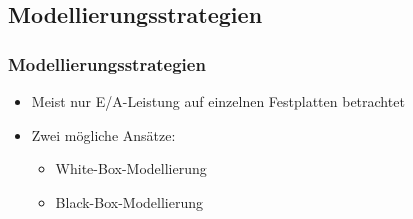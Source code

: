 \documentclass{beamer}
\begin{document}
\subsection{Modellierungsstrategien}
\begin{frame}
\frametitle{Modellierungsstrategien}
\begin{itemize}
	\item Meist nur E/A-Leistung auf einzelnen Festplatten betrachtet
	\item Zwei mögliche Ansätze:
	\begin{itemize}
		\item White-Box-Modellierung
		\item Black-Box-Modellierung
	\end{itemize}
\end{itemize}
\end{frame}
\end{document}
